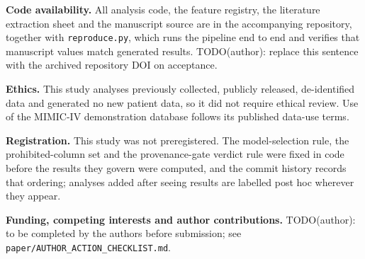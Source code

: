 \documentclass[conference]{IEEEtran}
\begin{document}
\textbf{Code availability.} All analysis code, the feature registry, the
literature extraction sheet and the manuscript source are in the
accompanying repository, together with \texttt{reproduce.py}, which runs the
pipeline end to end and verifies that manuscript values match generated
results. TODO(author): replace this sentence with the archived repository
DOI on acceptance.

\textbf{Ethics.} This study analyses previously collected, publicly
released, de-identified data and generated no new patient data, so it did
not require ethical review. Use of the MIMIC-IV demonstration database
follows its published data-use terms.

\textbf{Registration.} This study was not preregistered. The model-selection
rule, the prohibited-column set and the provenance-gate verdict rule were
fixed in code before the results they govern were computed, and the commit
history records that ordering; analyses added after seeing results are
labelled post hoc wherever they appear.

\textbf{Funding, competing interests and author contributions.}
TODO(author): to be completed by the authors before submission; see
\texttt{paper/AUTHOR\_ACTION\_CHECKLIST.md}.
\end{document}
